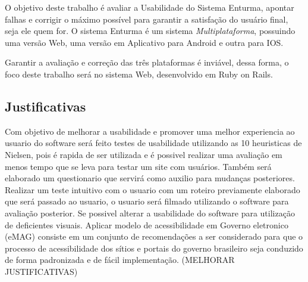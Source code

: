 	O objetivo deste trabalho é avaliar a Usabilidade do Sistema Enturma, apontar falhas e corrigir o máximo possível para garantir a satisfação do usuário final, seja ele quem for. O sistema Enturma é um sistema \textit{Multiplataforma}, possuindo uma versão Web, uma versão em Aplicativo para Android e outra para IOS.

	Garantir a avaliação e correção das três plataformas é inviável, dessa forma, o foco deste trabalho será no sistema Web, desenvolvido em Ruby on Rails.

\subsection{Justificativas}

	
	Com objetivo de melhorar a usabilidade e promover uma melhor experiencia ao usuario do software será feito testes de usabilidade utilizando as 10 heuristicas de Nielsen, pois é rapida de ser utilizada e é possivel realizar uma avaliação em menos tempo que se leva para testar um site com usuários.
	Também será elaborado um questionario que servirá como auxilio para mudanças posteriores.
	Realizar um teste intuitivo com o usuario com um roteiro previamente elaborado que será passado ao usuario,
	o usuario será filmado utilizando o software para avaliação posterior.
	Se possivel alterar a usabilidade do software para utilização de deficientes visuais.
	Aplicar modelo de acessibilidade em Governo eletronico (eMAG) consiste em um conjunto de recomendações a ser considerado para que o processo de acessibilidade dos sítios e portais do governo brasileiro seja conduzido de forma padronizada e de fácil implementação.
	(MELHORAR JUSTIFICATIVAS)



